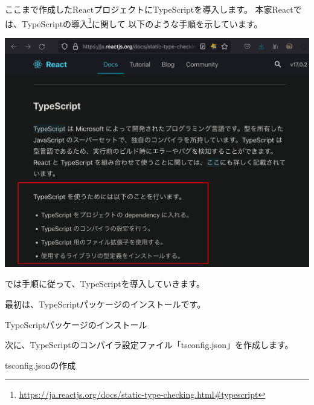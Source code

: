 ここまで作成したReactプロジェクトにTypeScriptを導入します。
本家Reactでは、TypeScriptの導入\footnote{\url{https://ja.reactjs.org/docs/static-type-checking.html\#typescript}}に関して
以下のような手順を示しています。

\begin{reviewimage}%
\includegraphics[width=0.8\maxwidth]{./images/02-create-react-app/typescript01.png}%
\label{image:02-create-react-app:typescript01}
\end{reviewimage}

では手順に従って、TypeScriptを導入していきます。

\vspace*{\baselineskip}

最初は、TypeScriptパッケージのインストールです。

\def\startercodeblockfontsize{}
\begin{starterterminal}[]{TypeScriptパッケージのインストール}\end{starterterminal}

次に、TypeScriptのコンパイラ設定ファイル「tsconfig.json」を作成します。

\def\startercodeblockfontsize{}
\begin{starterterminal}[]{tsconfig.jsonの作成}\end{starterterminal}

